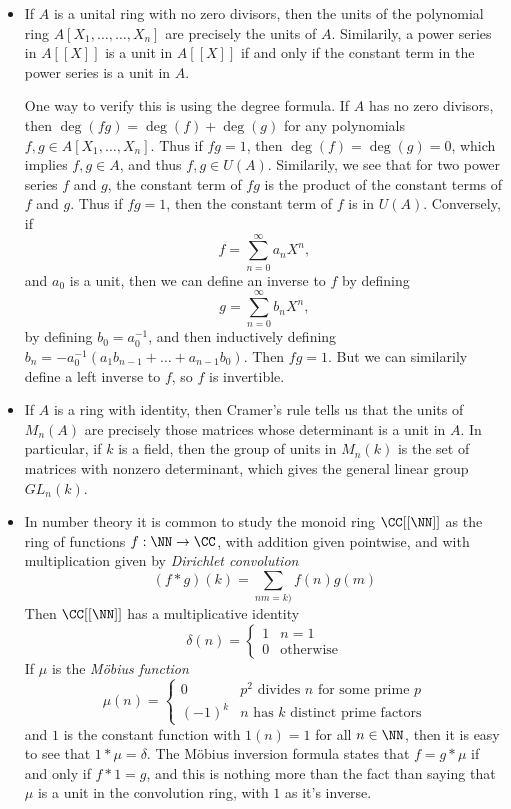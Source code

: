 \begin{itemize}
    \item If $A$ is a unital ring with no zero divisors, then the units of the polynomial ring $A[X_1, \dots, \dots, X_n]$ are precisely the units of $A$. Similarily, a power series in $A[[X]]$ is a unit in $A[[X]]$ if and only if the constant term in the power series is a unit in $A$.

    One way to verify this is using the degree formula. If $A$ has no zero divisors, then $\deg(fg) = \deg(f) + \deg(g)$ for any polynomials $f,g \in A[X_1, \dots, X_n]$. Thus if $fg = 1$, then $\deg(f) = \deg(g) = 0$, which implies $f,g \in A$, and thus $f,g \in U(A)$. Similarily, we see that for two power series $f$ and $g$, the constant term of $fg$ is the product of the constant terms of $f$ and $g$. Thus if $fg = 1$, then the constant term of $f$ is in $U(A)$. Conversely, if
    \[ f = \sum_{n = 0}^\infty a_n X^n, \]
    and $a_0$ is a unit, then we can define an inverse to $f$ by defining
    \[ g = \sum_{n = 0}^\infty b_n X^n, \]
    by defining $b_0 = a_0^{-1}$, and then inductively defining $b_n = -a_0^{-1}(a_1b_{n-1} + \dots + a_{n-1}b_0)$. Then $fg = 1$. But we can similarily define a left inverse to $f$, so $f$ is invertible.

    \item If $A$ is a ring with identity, then Cramer's rule tells us that the units of $M_n(A)$ are precisely those matrices whose determinant is a unit in $A$. In particular, if $k$ is a field, then the group of units in $M_n(k)$ is the set of matrices with nonzero determinant, which gives the general linear group $GL_n(k)$.

    \item In number theory it is common to study the monoid ring $\CC[[\NN]]$ as the ring of functions $f: \NN \to \CC$, with addition given pointwise, and with multiplication given by \emph{Dirichlet convolution}
    \[ (f * g)(k) = \sum_{nm = k)} f(n) g(m) \]
    Then $\CC[[\NN]]$ has a multiplicative identity
    \[ \delta(n) = \begin{cases} 1 & n = 1 \\ 0 & \text{otherwise} \end{cases} \]
    If $\mu$ is the {\it M\"{o}bius function}
    \[ \mu(n) = \begin{cases} 0 & \text{$p^2$ divides $n$ for some prime $p$} \\ (-1)^k & \text{$n$ has $k$ distinct prime factors} \end{cases} \]
    and $1$ is the constant function with $1(n) = 1$ for all $n \in \NN$, then it is easy to see that $1 * \mu = \delta$. The M\"{o}bius inversion formula states that $f = g * \mu$ if and only if $f * 1 = g$, and this is nothing more than the fact than saying that $\mu$ is a unit in the convolution ring, with $1$ as it's inverse.
\end{itemize}
